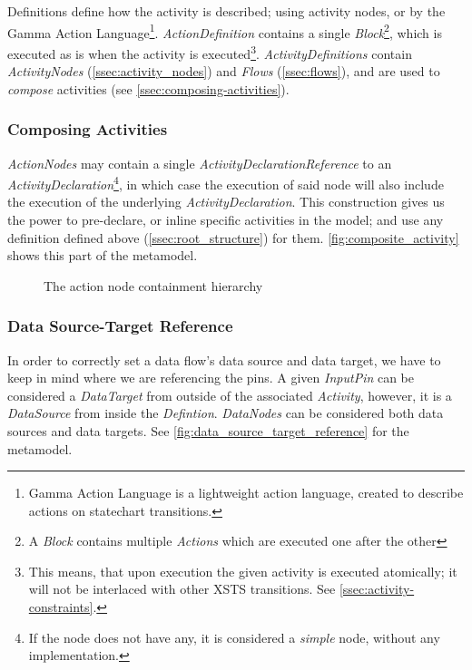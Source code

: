 Definitions define how the activity is described; using activity nodes, or by the Gamma Action Language\footnote{Gamma Action Language is a lightweight action language, created to describe actions on statechart transitions.}. \emph{ActionDefinition} contains a single \emph{Block}\footnote{A \emph{Block} contains multiple \emph{Actions} which are executed one after the other}, which is executed as is when the activity is executed\footnote{This means, that upon execution the given activity is executed atomically; it will not be interlaced with other XSTS transitions. See \autoref{ssec:activity-constraints}.}. \emph{ActivityDefinitions} contain \emph{ActivityNodes} (\autoref{ssec:activity_nodes}) and \emph{Flows} (\autoref{ssec:flows}), and are used to \emph{compose} activities (see \autoref{ssec:composing-activities}).

\subsubsection*{Composing Activities}\label{ssec:composing-activities}

\emph{ActionNodes} may contain a single \emph{ActivityDeclarationReference} to an \emph{ActivityDeclaration}\footnote{If the node does not have any, it is considered a \emph{simple} node, without any implementation.}, in which case the execution of said node will also include the execution of the underlying \emph{ActivityDeclaration}. This construction gives us the power to pre-declare, or inline specific activities in the model; and use any definition defined above (\autoref{ssec:root_structure})  for them. \autoref{fig:composite_activity} shows this part of the metamodel.

\begin{figure}[!ht]
	\centering
	
	\caption{The action node containment hierarchy}
	\label{fig:composite_activity}
\end{figure}

\subsubsection*{Data Source-Target Reference}\label{ssec:data-reference}

In order to correctly set a data flow's data source and data target, we have to keep in mind where we are referencing the pins. A given \emph{InputPin} can be considered a \emph{DataTarget} from outside of the associated \emph{Activity}, however, it is a \emph{DataSource} from inside the \emph{Defintion}. \emph{DataNodes} can be considered both data sources and data targets. See \autoref{fig:data_source_target_reference} for the metamodel.

